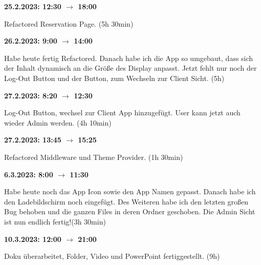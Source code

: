 \textbf{25.2.2023: 12:30 $\rightarrow$ 18:00} \

Refactored Reservation Page. (5h 30min)

\vspace{0.5cm}

\textbf{26.2.2023: 9:00 $\rightarrow$ 14:00} \

Habe heute fertig Refactored. Danach habe ich die App so umgebaut, dass sich der Inhalt dynamisch an die Größe des Display anpasst. Jetzt fehlt nur noch der Log-Out Button und der Button, zum Wechseln zur Client Sicht. (5h)

\vspace{0.5cm}

\textbf{27.2.2023: 8:20 $\rightarrow$ 12:30} \

Log-Out Button, wechsel zur Client App hinzugefügt. User kann jetzt auch wieder Admin werden. (4h 10min)

\vspace{0.5cm}

\textbf{27.2.2023: 13:45 $\rightarrow$ 15:25} \

Refactored Middleware und Theme Provider. (1h 30min)

\vspace{0.5cm}

\textbf{6.3.2023: 8:00 $\rightarrow$ 11:30} \

Habe heute noch das App Icon sowie den App Namen gepasst. Danach habe ich den Ladebildschirm noch eingefügt. Des Weiteren habe ich den letzten großen Bug behoben und die ganzen Files in deren Ordner geschoben. Die Admin Sicht ist nun endlich fertig!(3h 30min)

\vspace{0.5cm}

\textbf{10.3.2023: 12:00 $\rightarrow$ 21:00} \

Doku überarbeitet, Folder, Video und PowerPoint fertiggestellt. (9h)